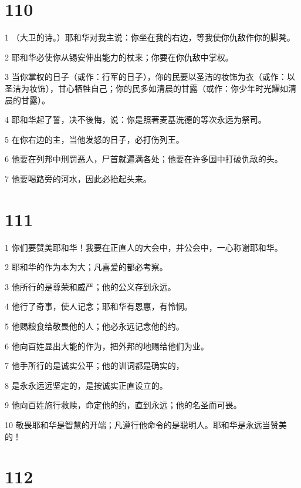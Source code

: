 \chapter{110}

\par 1 （大卫的诗。）耶和华对我主说：你坐在我的右边，等我使你仇敌作你的脚凳。
\par 2 耶和华必使你从锡安伸出能力的杖来；你要在你仇敌中掌权。
\par 3 当你掌权的日子（或作：行军的日子），你的民要以圣洁的妆饰为衣（或作：以圣洁为妆饰），甘心牺牲自己；你的民多如清晨的甘露（或作：你少年时光耀如清晨的甘露）。
\par 4 耶和华起了誓，决不後悔，说：你是照著麦基洗德的等次永远为祭司。
\par 5 在你右边的主，当他发怒的日子，必打伤列王。
\par 6 他要在列邦中刑罚恶人，尸首就遍满各处；他要在许多国中打破仇敌的头。
\par 7 他要喝路旁的河水，因此必抬起头来。

\chapter{111}

\par 1 你们要赞美耶和华！我要在正直人的大会中，并公会中，一心称谢耶和华。
\par 2 耶和华的作为本为大；凡喜爱的都必考察。
\par 3 他所行的是尊荣和威严；他的公义存到永远。
\par 4 他行了奇事，使人记念；耶和华有恩惠，有怜悯。
\par 5 他赐粮食给敬畏他的人；他必永远记念他的约。
\par 6 他向百姓显出大能的作为，把外邦的地赐给他们为业。
\par 7 他手所行的是诚实公平；他的训词都是确实的，
\par 8 是永永远远坚定的，是按诚实正直设立的。
\par 9 他向百姓施行救赎，命定他的约，直到永远；他的名圣而可畏。
\par 10 敬畏耶和华是智慧的开端；凡遵行他命令的是聪明人。耶和华是永远当赞美的！

\chapter{112}

